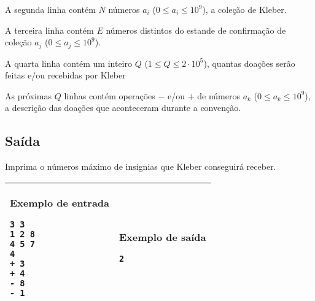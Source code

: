 A segunda linha contém $N$ números $a_i$ ($0 \leq a_i \leq 10^9$), a coleção de Kleber.

A terceira linha contém $E$ números distintos do estande de confirmação de coleção $a_j$ ($0 \leq a_j \leq 10^9$).

A quarta linha contém um inteiro $Q$ ($1 \leq Q \leq 2 \cdot 10^5$), quantas doações serão feitas e/ou recebidas por Kleber

As próximas $Q$ linhas contém operações $-$ e/ou $+$ de números $a_k$ ($0 \leq a_k \leq 10^9$), a descrição das doações que aconteceram durante a convenção.

\subsection*{Saída}
Imprima o números máximo de insígnias que Kleber conseguirá receber.

\newpage
\begin{table}[!h]
\centering
\begin{tabular}{|l|l|}
\hline
\begin{minipage}[t]{3in}
\textbf{Exemplo de entrada}
\begin{verbatim}
3 3
1 2 8
4 5 7
4
+ 3
+ 4
- 8
- 1
\end{verbatim}
\vspace{1mm}
\end{minipage}
&
\begin{minipage}[t]{3in}
\textbf{Exemplo de saída}
\begin{verbatim}
2
\end{verbatim}
\vspace{1mm}
\end{minipage} \\
\hline
\end{tabular}
\end{table}
